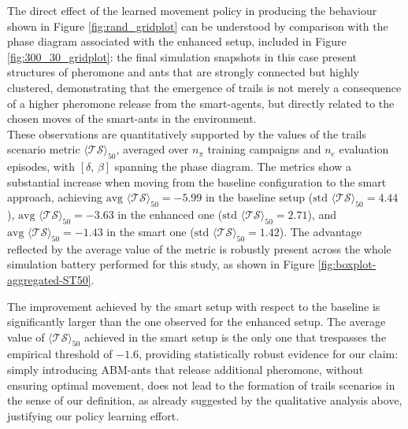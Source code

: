 \documentclass[openacc]{rsproca_new}
\begin{document}
The direct effect of the learned movement policy in producing the behaviour shown in Figure \ref{fig:rand_gridplot} can be understood by comparison with the phase diagram associated with the enhanced setup, included in Figure \ref{fig:300_30_gridplot}: the final simulation snapshots in this case present structures of pheromone and ants that are strongly connected but highly clustered, demonstrating that the emergence of trails is not merely a consequence of a higher pheromone release from the smart-agents, but directly related to the chosen moves of the smart-ants in the environment.\\

These observations are quantitatively supported by %
 the values of the trails scenario metric %
 $\langle \mathcal{TS} \rangle_{50}$, averaged over $n_{\pi}$ training campaigns and $n_{e}$ evaluation episodes, with $\left[ \delta, \, \beta \right]$ spanning the phase diagram. %
 The metrics show a substantial increase when moving from the baseline configuration to the smart approach, achieving $\text{avg}\,\,\langle \mathcal{TS} \rangle_{50} = -5.99$ in the baseline setup ($\text{std}\,\,\langle \mathcal{TS} \rangle_{50} = 4.44$), $\text{avg}\,\, \langle \mathcal{TS} \rangle_{50} = -3.63$ in the enhanced one ($\text{std}\,\,\langle \mathcal{TS} \rangle_{50} = 2.71$), and $\text{avg}\,\, \langle \mathcal{TS} \rangle_{50} = -1.43$ in the smart one ($\text{std}\,\,\langle \mathcal{TS} \rangle_{50} = 1.42$). The advantage reflected by the average value of the metric is robustly present across the whole simulation battery performed for this study, as shown in Figure \ref{fig:boxplot-aggregated-ST50}. 
 
The improvement achieved by the smart setup with respect to the baseline is significantly larger than the one observed for the enhanced setup. The average value of $\langle \mathcal{TS} \rangle_{50}$ achieved in the smart setup is the only one that trespasses the empirical threshold of $-1.6$, providing statistically robust evidence for our claim: simply introducing ABM-ants that release additional pheromone, without ensuring optimal movement, does not lead to the formation of trails scenarios in the sense of our definition, as already suggested by the qualitative analysis above, justifying our policy learning effort. 
\end{document}
